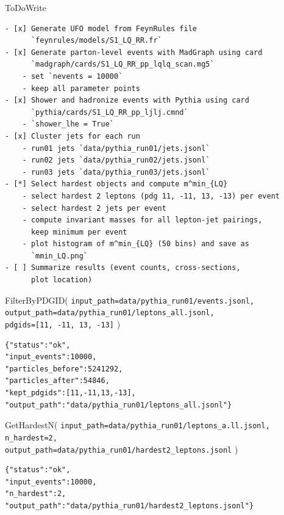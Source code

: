 \documentclass[11pt,oneside]{article}
\numberwithin{equation}{section}
\begin{document}
\begin{orchestralagentmessage}
\begin{orchestraltoolmessage}{ToDoWrite}
\begin{verbatim}
- [x] Generate UFO model from FeynRules file 
      `feynrules/models/S1_LQ_RR.fr`
- [x] Generate parton‑level events with MadGraph using card 
      `madgraph/cards/S1_LQ_RR_pp_lqlq_scan.mg5`
    - set `nevents = 10000`
    - keep all parameter points
- [x] Shower and hadronize events with Pythia using card 
      `pythia/cards/S1_LQ_RR_pp_ljlj.cmnd`
    - `shower_lhe = True`
- [x] Cluster jets for each run
    - run01 jets `data/pythia_run01/jets.jsonl`
    - run02 jets `data/pythia_run02/jets.jsonl`
    - run03 jets `data/pythia_run03/jets.jsonl`
- [*] Select hardest objects and compute m^min_{LQ}
    - select hardest 2 leptons (pdg 11, -11, 13, -13) per event
    - select hardest 2 jets per event
    - compute invariant masses for all lepton-jet pairings, 
      keep minimum per event
    - plot histogram of m^min_{LQ} (50 bins) and save as 
      `mmin_LQ.png`
- [ ] Summarize results (event counts, cross-sections, 
      plot location)
\end{verbatim}
    \end{orchestraltoolmessage}


    \begin{orchestraltoolmessageml}{FilterByPDGID(  \texttt{input\_path=data/pythia\_run01/events.jsonl,}\\
        \hphantom{FilterByPDGID(} \texttt{output\_path=data/pythia\_run01/leptons\_all.jsonl,}\\\hphantom{FilterByPDGID(}
        \texttt{pdgids=[11, -11, 13, -13]} )}
\begin{verbatim}
{"status":"ok",
"input_events":10000,
"particles_before":5241292,
"particles_after":54846,
"kept_pdgids":[11,-11,13,-13],
"output_path":"data/pythia_run01/leptons_all.jsonl"}
\end{verbatim}
    \end{orchestraltoolmessageml}


    \begin{orchestraltoolmessageml}{GetHardestN( \texttt{input\_path=data/pythia\_run01/leptons\_a.ll.jsonl,}\\
        \hphantom{GetHardestN(}
         \texttt{n\_hardest=2,}\\
        \hphantom{GetHardestN(} \texttt{output\_path=data/pythia\_run01/hardest2\_leptons.jsonl} )}
\begin{verbatim}
{"status":"ok",
"input_events":10000,
"n_hardest":2,
"output_path":"data/pythia_run01/hardest2_leptons.jsonl"}
\end{verbatim}
    \end{orchestraltoolmessageml}



\end{orchestralagentmessage}
\end{document}
